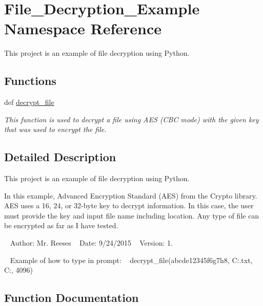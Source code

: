 \hypertarget{namespace_file___decryption___example}{}\section{File\+\_\+\+Decryption\+\_\+\+Example Namespace Reference}
\label{namespace_file___decryption___example}


This project is an example of file decryption using Python.  


\subsection*{Functions}
\begin{DoxyCompactItemize}
\item 
def \hyperlink{namespace_file___decryption___example_a461dc3e67f103b9de8694a77a178ba3f}{decrypt\+\_\+file}
\begin{DoxyCompactList}\small\item\em This function is used to decrypt a file using A\+E\+S (C\+B\+C mode) with the given key that was used to encrypt the file. \end{DoxyCompactList}\end{DoxyCompactItemize}


\subsection{Detailed Description}
This project is an example of file decryption using Python. 

In this example, Advanced Encryption Standard (A\+E\+S) from the Crypto library. A\+E\+S uses a 16, 24, or 32-\/byte key to decrypt information. In this case, the user must provide the key and input file name including location. Any type of file can be encrypted as far as I have tested.

~\newline
 Author\+: Mr. Reeses ~\newline
 Date\+: 9/24/2015 ~\newline
 Version\+: 1.

~\newline
 Example of how to type in prompt\+: ~\newline
 decrypt\+\_\+file(\textquotesingle{}abcde12345f6g7h8\textquotesingle{}, \textquotesingle{}C\+:.txt\textquotesingle{}, \textquotesingle{}C\+:\textquotesingle{}, 4096) 

\subsection{Function Documentation}
\hypertarget{namespace_file___decryption___example_a461dc3e67f103b9de8694a77a178ba3f}{}
